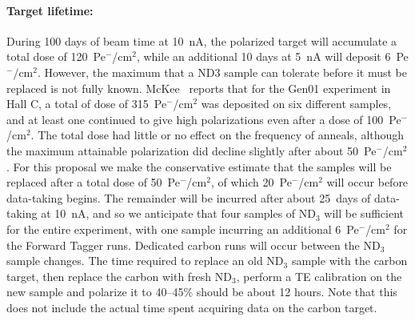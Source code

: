 \paragraph{Target lifetime:}
During 100 days of beam time at 10~nA, the polarized target
will accumulate a total dose of 120~Pe$^-$/cm$^2$, while an additional 10 days at 5~nA will deposit
6~Pe$^-$/cm$^2$.
However, the maximum that a ND$3$ sample can tolerate before it must be replaced is not fully known.  
McKee~\cite{McKee2004} reports that for the Gen01 experiment in Hall C, a total of dose of
315~Pe$^{\minus}$/cm$^2$ was deposited on six different samples, and at least one continued to give high polarizations even after a dose of 100~Pe$^{\minus}$/cm$^2$.  The total dose had little or no effect on the frequency of anneals, although the maximum attainable polarization did decline slightly after about 
50~Pe$^{\minus}$/cm$^2$.   For this proposal we make the conservative estimate that the samples will be replaced after a total dose of 50~Pe$^{\minus}$/cm$^2$, of which 20~Pe$^{\minus}$/cm$^2$
will occur before data-taking begins.  The remainder will be incurred after about
25~days of data-taking at 10~nA, and so we anticipate that four samples of ND$_3$ will be sufficient 
for the entire experiment, with one sample incurring an additional 6~Pe$^-$/cm$^2$ 
for the Forward Tagger runs.  Dedicated carbon runs will occur between the ND$_3$ sample changes.
The time required to replace an old ND$_3$ sample with the carbon target, then replace the carbon with fresh
ND$_3$, perform a TE calibration on the new sample and polarize it to 40--45\% should be about 12 hours. Note that this does not include the actual time spent acquiring data on the carbon target.

\vspace{-.15in}
